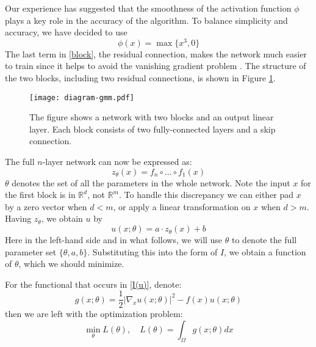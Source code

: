 \documentclass[a4paper,12pt]{article}
\begin{document}
Our experience has suggested that the smoothness of the activation
function $\phi$ plays a key role in the accuracy of the algorithm.
To balance simplicity and accuracy, we have decided to use
\begin{equation}
\phi(x)=\max\{x^3,0\}
\end{equation}
The last term in \eqref{block}, the residual connection, 
makes the network much easier to train since it helps to avoid the vanishing gradient problem \cite{resnet}. 
The structure of the two blocks, including two residual connections, 
is shown in Figure \ref{fig:net_structure_1}.
 
\begin{figure}[!h]
\centering
\vspace{2pt}
\texttt{[image: diagram-gmm.pdf]}
\caption{The figure shows a network with two blocks and an output linear layer.
Each block consists of two fully-connected layers and a skip connection.\label{fig:net_structure_1}}
\end{figure}




The full $n$-layer network can now be expressed as:
\begin{equation}
z_{\theta}(x)=f_n\circ ... \circ f_1(x)
\end{equation}
$\theta$ denotes the set of all the parameters in the whole network.
Note the input $x$ for the first block is in $\mathbb{R}^d$, not $\mathbb{R}^{m}$.
To handle this discrepancy we can either
pad $x$ by a zero vector when $d<m$, or apply a linear transformation 
on $x$ when $d>m$. 
Having $z_\theta$, we obtain $u$ by
\begin{equation}
u(x; \theta) = a \cdot z_\theta (x) + b
\label{function-form}
\end{equation}
Here in the left-hand side and in what follows, we will use
$\theta$ to denote the full parameter set $\{\theta, a, b \}$. Substituting this into the form of $I$, we obtain a function of $\theta$,
which we should minimize.

For the functional that occurs in \eqref{I(u)}, denote:
\begin{equation}
g(x; \theta) = \frac 12 |\nabla_x u(x; \theta)|^2 - f(x) u(x; \theta)
\end{equation}
then we are left with the optimization problem:
\begin{equation}
\min_\theta L(\theta), \quad L(\theta) = \int_\Omega g(x; \theta) dx
\label{integral}
\end{equation}
\end{document}
